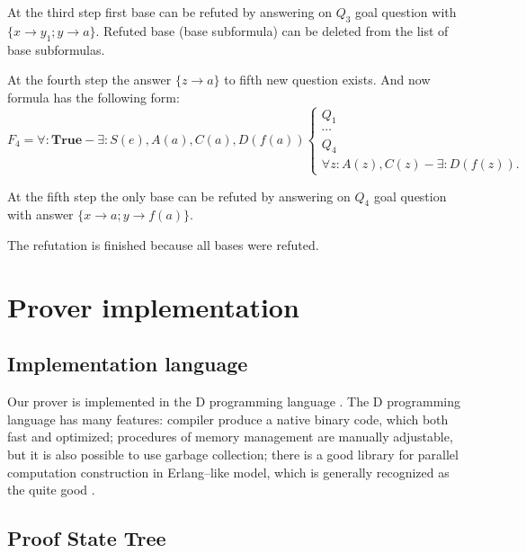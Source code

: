 \documentclass[runningheads,a4paper]{llncs}
\begin{document}
\begin{example}
At the third step first base can be refuted by answering on $Q_3$ goal question with $\{x \rightarrow y_1; y \rightarrow a\}$. Refuted base (base subformula) can be deleted from the list of base subformulas.

At the fourth step the answer $\{z \rightarrow a\}$ to fifth new question exists. And now formula has the following form:
\begin{equation*}\label{ex:f5}
  F_4 = \forall\colon\boldsymbol{True} - \exists\colon S(e),A(a), C(a),D(f(a))
  \left\lbrace
  \begin{array}{l}
    Q_1 \\ \cdots \\ Q_4 \\
    \forall z\colon A(z),C(z) - \exists\colon D(f(z)).
  \end{array}\right.
\end{equation*}

At the fifth step the only base can be refuted by answering on $Q_4$ goal question with  answer $\{x \rightarrow a; y \rightarrow f(a)\}$.

The refutation is finished because all bases were refuted.

\end{example}


\section{Prover implementation}

\subsection{Implementation language}

Our prover is implemented in the D programming language \cite{DPL1,DPL2}. The D programming language has many features: compiler produce a native binary code, which both fast and optimized; procedures of memory management are manually adjustable, but it is also possible to use garbage collection; there is a good library for parallel computation construction in Erlang--like model, which is generally recognized as the quite good \cite{Erlang1}.

\subsection{Proof State Tree}
\end{document}
